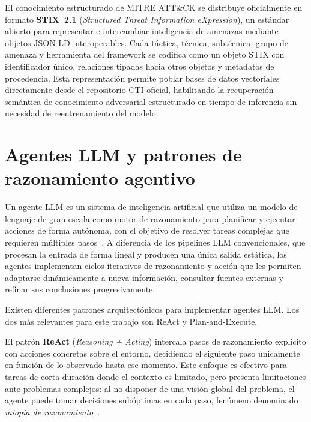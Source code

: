 El conocimiento estructurado de MITRE ATT\&CK se distribuye
oficialmente en formato \textbf{STIX~2.1} (\textit{Structured Threat
Information eXpression}), un estándar abierto para representar e
intercambiar inteligencia de amenazas mediante objetos JSON-LD
interoperables. Cada táctica, técnica, subtécnica, grupo de amenaza
y herramienta del framework se codifica como un objeto STIX con
identificador único, relaciones tipadas hacia otros objetos y metadatos
de procedencia. Esta representación permite poblar bases de datos
vectoriales directamente desde el repositorio CTI oficial, habilitando
la recuperación semántica de conocimiento adversarial estructurado
en tiempo de inferencia sin necesidad de reentrenamiento del modelo.

\section{Agentes LLM y patrones de razonamiento agentivo}

Un agente LLM es un sistema de inteligencia artificial que utiliza
un modelo de lenguaje de gran escala como motor de razonamiento
para planificar y ejecutar acciones de forma autónoma, con el
objetivo de resolver tareas complejas que requieren múltiples
pasos~\cite{hassan2026elisar}. A diferencia de los pipelines LLM
convencionales, que procesan la entrada de forma lineal y producen
una única salida estática, los agentes implementan ciclos iterativos
de razonamiento y acción que les permiten adaptarse dinámicamente
a nueva información, consultar fuentes externas y refinar sus
conclusiones progresivamente.

Existen diferentes patrones arquitectónicos para implementar
agentes LLM. Los dos más relevantes para este trabajo son ReAct
y Plan-and-Execute.

El patrón \textbf{ReAct} (\textit{Reasoning + Acting}) intercala
pasos de razonamiento explícito con acciones concretas sobre el
entorno, decidiendo el siguiente paso únicamente en función de lo
observado hasta ese momento. Este enfoque es efectivo para tareas
de corta duración donde el contexto es limitado, pero presenta
limitaciones ante problemas complejos: al no disponer de una visión
global del problema, el agente puede tomar decisiones subóptimas en
cada paso, fenómeno denominado \textit{miopía de razonamiento}~\cite{rigaki2023cage}.

